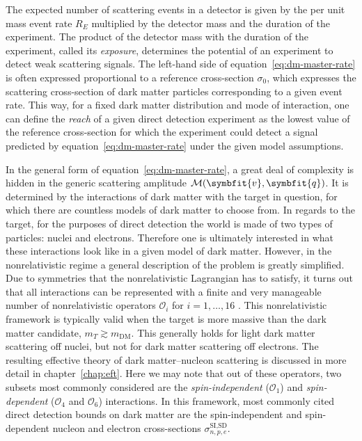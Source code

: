 \documentclass[b5paper, 10pt, twoside]{book}
\renewcommand{\vec}[1]{\symbfit{#1}}
\begin{document}
The expected number of scattering events in a detector is given by the per unit mass event rate $R_E$ multiplied by the detector mass and the duration of the experiment. The product of the detector mass with the duration of the experiment, called its \emph{exposure}, determines the potential of an experiment to detect weak scattering signals. The left-hand side of equation~\eqref{eq:dm-master-rate} is often expressed proportional to a reference cross-section $\sigma_0$, which expresses the scattering cross-section of dark matter particles corresponding to a given event rate. This way, for a fixed dark matter distribution and mode of interaction, one can define the \emph{reach} of a given direct detection experiment as the lowest value of the reference cross-section for which the experiment could detect a signal predicted by equation~\eqref{eq:dm-master-rate} under the given model assumptions.

In the general form of equation~\eqref{eq:dm-master-rate}, a great deal of complexity is hidden in the generic scattering amplitude $\mathcal{M}(\vec{v},\vec{q})$. It is determined by the interactions of dark matter with the target in question, for which there are countless models of dark matter to choose from. In regards to the target, for the purposes of direct detection the world is made of two types of particles: nuclei and electrons. Therefore one is ultimately interested in what these interactions look like in a given model of dark matter. However, in the nonrelativistic regime a general description of the problem is greatly simplified. Due to symmetries that the nonrelativistic Lagrangian has to satisfy, it turns out that all interactions can be represented with a finite and very manageable number of nonrelativistic operators $\mathcal{O}_i$ for $i=1,\ldots,16$ \parencite{FitzpatrickEtAl2013}. This nonrelativistic framework is typically valid when the target is more massive than the dark matter candidate, $m_T\gtrsim m_\text{DM}$. This generally holds for light dark matter scattering off nuclei, but not for dark matter scattering off electrons. The resulting effective theory of dark matter--nucleon scattering is discussed in more detail in chapter~\ref{chap:eft}. Here we may note that out of these operators, two subsets most commonly considered are the \emph{spin-independent} ($\mathcal{O_1}$) and \emph{spin-dependent} ($\mathcal{O}_4$ and $\mathcal{O}_6$) interactions. In this framework, most commonly cited direct detection bounds on dark matter are the spin-independent and spin-dependent nucleon and electron cross-sections $\sigma_{n,p,e}^{\text{SI},\text{SD}}$.
\end{document}
